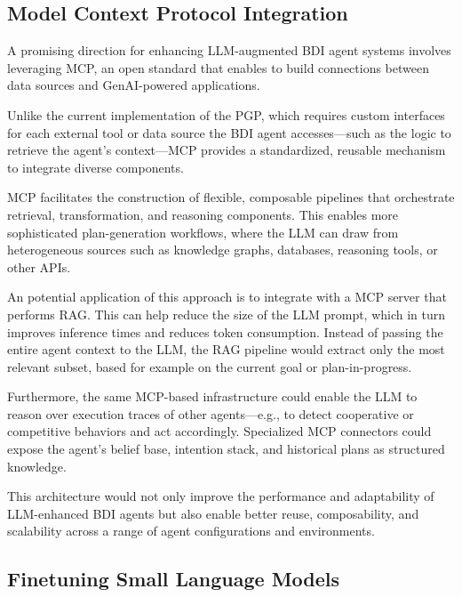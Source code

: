 \documentclass[12pt,a4paper,openright,twoside]{book}
\begin{document}
\subsection{Model Context Protocol Integration}\label{sec:mcp-integration}

A promising direction for enhancing \ac{LLM}-augmented \ac{BDI} agent systems involves leveraging \ac{MCP}, an open standard that enables to build connections between data sources and GenAI-powered applications.

Unlike the current implementation of the \ac{PGP}, which requires custom interfaces for each external tool or data source the BDI agent accesses---such as the logic to retrieve the agent's context---\ac{MCP} provides a standardized, reusable mechanism to integrate diverse components.

\ac{MCP} facilitates the construction of flexible, composable pipelines that orchestrate retrieval, transformation, and reasoning components. 
%
This enables more sophisticated plan-generation workflows, where the \ac{LLM} can draw from heterogeneous sources such as knowledge graphs, databases, reasoning tools, or other APIs.

An potential application of this approach is to integrate with a \ac{MCP} server that performs \ac{RAG}. 
%
This can help reduce the size of the \ac{LLM} prompt, which in turn improves inference times and reduces token consumption. 
%
Instead of passing the entire agent context to the \ac{LLM}, the \ac{RAG} pipeline would extract only the most relevant subset, based for example on the current goal or plan-in-progress.

Furthermore, the same \ac{MCP}-based infrastructure could enable the \ac{LLM} to reason over execution traces of other agents---e.g., to detect cooperative or competitive behaviors and act accordingly. 
%
Specialized \ac{MCP} connectors could expose the agent's belief base, intention stack, and historical plans as structured knowledge.

This architecture would not only improve the performance and adaptability of \ac{LLM}-enhanced BDI agents but also enable better reuse, composability, and scalability across a range of agent configurations and environments.

\subsection{Finetuning Small Language Models}\label{sec:finetuning}
\end{document}
